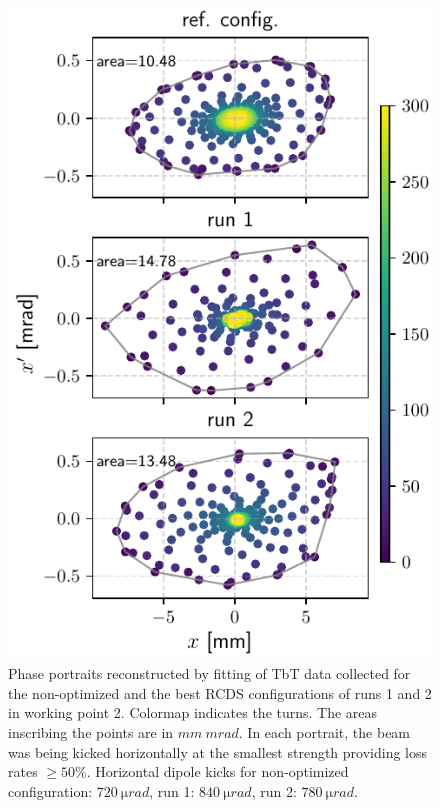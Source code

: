 \documentclass[a4paper,
               keeplastbox,   %
               ]{jacow}
\begin{document}
\begin{figure}
   \includegraphics[width=\columnwidth]{new_tunes_phase_and_areas.pdf}
   \caption{Phase portraits reconstructed by fitting of TbT data collected for the non-optimized and the best RCDS configurations of runs 1 and 2 in working point 2. Colormap indicates the turns. The areas inscribing the points are in $\unit{mm}~\unit{mrad}$. In each portrait, the beam was being kicked horizontally at the smallest strength providing loss rates $\geq 50\%$. Horizontal dipole kicks for non-optimized configuration: $720~\unit{\micro rad}$, run 1: $840~\unit{\micro rad}$, run 2: $780~\unit{\micro rad}$.}
   \label{fig:newtunes_phase}
\end{figure}
\end{document}
